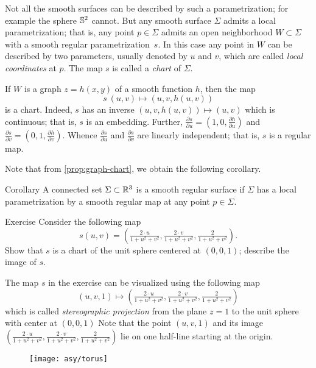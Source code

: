 Not all the smooth surfaces can be described by such a parametrization;
for example the sphere $\mathbb{S}^2$ cannot.
But any smooth surface $\Sigma$ admits a local parametrization; that is, any point $p\in\Sigma$ admits an open neighborhood $W\subset \Sigma$ with a smooth regular parametrization~$s$.
In this case any point in $W$ can be described by two parameters, usually denoted by $u$ and $v$, 
which are called \emph{local coordinates} at $p$.
The map $s$ is called a \emph{chart} of $\Sigma$.

If $W$ is a graph $z=h(x,y)$ of a smooth function $h$, then the map 
\[s\:(u,v)\mapsto (u,v,h(u,v))\] is a chart.
Indeed, $s$ has an inverse $(u,v,h(u,v))\mapsto (u,v)$ which is continuous;
that is, $s$ is an embedding.
Further,
$\tfrac{\partial s}{\partial u}=(1,0,\tfrac{\partial h}{\partial u})$ and $\tfrac{\partial s}{\partial v}=(0,1,\tfrac{\partial h}{\partial v})$. 
Whence $\tfrac{\partial s}{\partial u}$ and $\tfrac{\partial s}{\partial v}$ are linearly independent;
that is, $s$ is a regular map.

Note that from \ref{prop:graph-chart}, we obtain the following corollary.

\begin{thm}{Corollary}
A connected set $\Sigma\subset \mathbb{R}^3$ is a smooth regular surface if $\Sigma$ has a local parametrization by a smooth regular map at any point $p\in\Sigma$.
\end{thm}


\begin{thm}{Exercise}\label{ex:inversion}
Consider the following map 
\[s(u,v)=(\tfrac{2\cdot u}{1+u^2+v^2},\tfrac{2\cdot v}{1+u^2+v^2},\tfrac{2}{1+u^2+v^2}).\]
Show that $s$ is a chart of the unit sphere centered at $(0,0,1)$; describe the image of $s$.
\end{thm}

The map $s$ in the exercise can be visualized using the following map
\[(u,v,1)\mapsto (\tfrac{2\cdot u}{1+u^2+v^2},\tfrac{2\cdot v}{1+u^2+v^2},\tfrac{2}{1+u^2+v^2})\]
which is called \emph{stereographic projection} from the plane $z=1$ to the unit sphere with center at $(0,0,1)$
Note that the point $(u,v,1)$ and its image $(\tfrac{2\cdot u}{1+u^2+v^2},\tfrac{2\cdot v}{1+u^2+v^2},\tfrac{2}{1+u^2+v^2})$ lie on one half-line starting at the origin. %

\begin{wrapfigure}{o}{40 mm}
\vskip-4mm
\centering
\texttt{[image: asy/torus]}
\vskip-3mm
\end{wrapfigure}

